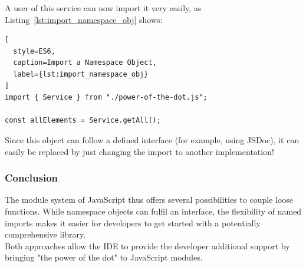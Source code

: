 A user of this service can now import it very easily, as
Listing~\ref{lst:import_namespace_obj} shows:

\begin{lstlisting}[
  style=ES6,
  caption=Import a Namespace Object,
  label={lst:import_namespace_obj}
]
import { Service } from "./power-of-the-dot.js";

const allElements = Service.getAll();
\end{lstlisting}

Since this object can follow a defined interface (for example, using JSDoc), it
can easily be replaced by just changing the import to another implementation!

\subsubsection{Conclusion} %
\label{subsub:Power_of_the_dot_Conclusion}
The module system of JavaScript thus offers several possibilities to couple
loose functions. While namespace objects can fulfil an interface, the
flexibility of named imports makes it easier for developers to get started with
a potentially comprehensive library. \\ 
Both approaches allow the IDE to provide the developer additional support by
bringing "the power of the dot" to JavaScript modules.

